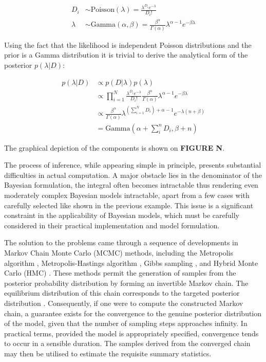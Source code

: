 \begin{align}
    D_i & \sim \text{Poisson}(\lambda) = \frac{\lambda^{D_i} e^{-\lambda}}{D_i!} \\
    \lambda & \sim \text{Gamma}(\alpha, \beta) = \frac{\beta^\alpha}{\Gamma(\alpha)} \lambda^{\alpha - 1} e^{-\beta \lambda}
\end{align}
    
Using the fact that the likelihood is independent Poisson distributions and the prior is a Gamma distribution it is trivial to derive the analytical form of the posterior $p(\lambda|D)$:

\begin{align}
        p(\lambda|D) & \propto p(D|\lambda) p(\lambda) \\
         & \propto \prod_{i=1}^N \frac{\lambda^{D_i} e^{-\lambda}}{D_i!} \frac{\beta^\alpha}{\Gamma(\alpha)} \lambda^{\alpha - 1} e^{-\beta \lambda} \\ 
        & \propto  \frac{\beta^\alpha}{\Gamma(\alpha)} \lambda^{\left(\sum_{i=1}^N D_i\right) + \alpha - 1} e^{-\lambda(n+\beta)} \\
         & = \text{Gamma}(\alpha + \sum_i^n D_i, \beta + n)
\end{align}

The graphical depiction of the components is shown on \textbf{FIGURE N}.


The process of inference, while appearing simple in principle, presents substantial difficulties in actual computation. A major obstacle lies in the denominator of the Bayesian formulation, the integral often becomes intractable  thus rendering even moderately complex Bayesian models intractable, apart from a few cases with carefully selected  like shown in the previous example. This issue is a significant constraint in the applicability of Bayesian models, which must be carefully considered in their practical implementation and model formulation.

The solution to the problems came through a sequence of developments in Markov Chain Monte Carlo (MCMC) methods, including the Metropolis algorithm \citep{Rosenbluth1953-gu}, Metropolis-Hastings algorithm \citep{Hastings1970-mb}, Gibbs sampling \citep{Geman1984-nk}, and Hybrid Monte Carlo (HMC) \citep{Duane1987-gu}. These methods permit the generation of samples from the posterior probability distribution by forming an invertible Markov chain. The equilibrium distribution of this chain corresponds to the targeted posterior distribution \citep{Roberts2004-op}. Consequently, if one were to compute the constructed Markov chain, a guarantee exists for the convergence to the genuine posterior distribution of the model, given that the number of sampling steps approaches infinity. In practical terms, provided the model is appropriately specified, convergence tends to occur in a sensible duration. The samples derived from the converged chain may then be utilised to estimate the requisite summary statistics. 

